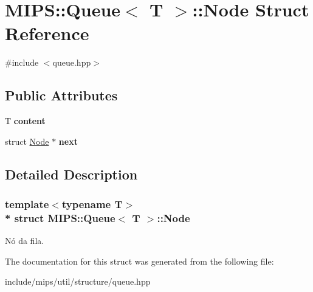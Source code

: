 \hypertarget{structMIPS_1_1Queue_1_1Node}{}\section{M\+I\+PS\+:\+:Queue$<$ T $>$\+:\+:Node Struct Reference}
\label{structMIPS_1_1Queue_1_1Node}


{\ttfamily \#include $<$queue.\+hpp$>$}

\subsection*{Public Attributes}
\begin{DoxyCompactItemize}
\item 
T {\bfseries content}\hypertarget{structMIPS_1_1Queue_1_1Node_a9d9a04736b082d82495e40d5aa1135b0}{}\label{structMIPS_1_1Queue_1_1Node_a9d9a04736b082d82495e40d5aa1135b0}

\item 
struct \hyperlink{structMIPS_1_1Queue_1_1Node}{Node} $\ast$ {\bfseries next}\hypertarget{structMIPS_1_1Queue_1_1Node_abd5a8271355d9455cf1cc038217fbecc}{}\label{structMIPS_1_1Queue_1_1Node_abd5a8271355d9455cf1cc038217fbecc}

\end{DoxyCompactItemize}


\subsection{Detailed Description}
\subsubsection*{template$<$typename T$>$\\*
struct M\+I\+P\+S\+::\+Queue$<$ T $>$\+::\+Node}

Nó da fila. 

The documentation for this struct was generated from the following file\+:\begin{DoxyCompactItemize}
\item 
include/mips/util/structure/queue.\+hpp\end{DoxyCompactItemize}
